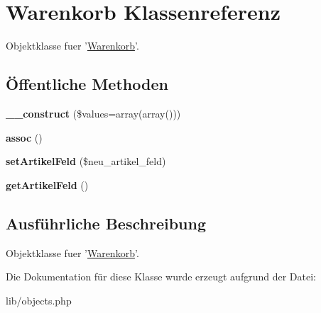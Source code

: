 \hypertarget{classWarenkorb}{\section{\-Warenkorb \-Klassenreferenz}
\label{classWarenkorb}
}


\-Objektklasse fuer '\hyperlink{classWarenkorb}{\-Warenkorb}'.  


\subsection*{Öffentliche \-Methoden}
\begin{DoxyCompactItemize}
\item 
\hypertarget{classWarenkorb_ada520aa46f7a0c8128c681e7769df763}{{\bfseries \-\_\-\-\_\-construct} (\$values=array(array()))}\label{classWarenkorb_ada520aa46f7a0c8128c681e7769df763}

\item 
\hypertarget{classWarenkorb_a4397c99a3a18b1851aaa517f88025e2b}{{\bfseries assoc} ()}\label{classWarenkorb_a4397c99a3a18b1851aaa517f88025e2b}

\item 
\hypertarget{classWarenkorb_ad2f4c6f92ce600725ddea544a5f219c5}{{\bfseries set\-Artikel\-Feld} (\$neu\-\_\-artikel\-\_\-feld)}\label{classWarenkorb_ad2f4c6f92ce600725ddea544a5f219c5}

\item 
\hypertarget{classWarenkorb_af18c96f0229f43bbeed4800a5c834172}{{\bfseries get\-Artikel\-Feld} ()}\label{classWarenkorb_af18c96f0229f43bbeed4800a5c834172}

\end{DoxyCompactItemize}


\subsection{\-Ausführliche \-Beschreibung}
\-Objektklasse fuer '\hyperlink{classWarenkorb}{\-Warenkorb}'. 

\-Die \-Dokumentation für diese \-Klasse wurde erzeugt aufgrund der \-Datei\-:\begin{DoxyCompactItemize}
\item 
lib/objects.\-php\end{DoxyCompactItemize}
